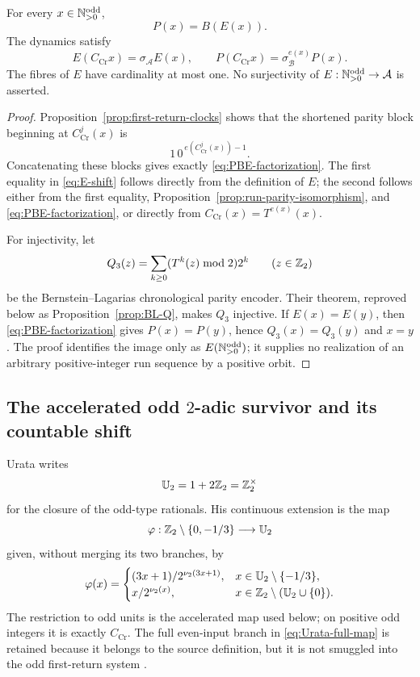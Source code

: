\begin{theorem}
\label{thm:first-return-coding}
For every $x\in\mathbb{N}_{>0}^{\mathrm{odd}}$,
\begin{equation}
\label{eq:PBE-factorization}
 P(x)=B(E(x)).
\end{equation}
The dynamics satisfy
\begin{equation}
\label{eq:E-shift}
 E(C_{\mathrm{Cr}}x)=\sigma_{\mathcal A}E(x),
 \qquad
 P(C_{\mathrm{Cr}}x)=\sigma_{\mathcal B}^{e(x)}P(x).
\end{equation}
The fibres of $E$ have cardinality at most one.  No surjectivity of
$E:\mathbb{N}_{>0}^{\mathrm{odd}}\to\mathcal A$ is asserted.
\end{theorem}

\begin{proof}
Proposition~\ref{prop:first-return-clocks} shows that the shortened parity
block beginning at $C_{\mathrm{Cr}}^j(x)$ is
\[
 1\,0^{\,e(C_{\mathrm{Cr}}^j(x))-1}.
\]
Concatenating these blocks gives exactly \eqref{eq:PBE-factorization}.  The
first equality in \eqref{eq:E-shift} follows directly from the definition of
$E$; the second follows either from the first equality,
Proposition~\ref{prop:run-parity-isomorphism}, and
\eqref{eq:PBE-factorization}, or directly from
$C_{\mathrm{Cr}}(x)=T^{e(x)}(x)$.

For injectivity, let
\[
 Q_3(z)=\sum_{k\geq0}(T^k(z)\bmod2)2^k
 \qquad(z\in\mathbb{Z}_{2})
\]
be the Bernstein--Lagarias chronological parity encoder.  Their theorem,
reproved below as Proposition~\ref{prop:BL-Q}, makes $Q_3$ injective.  If
$E(x)=E(y)$, then \eqref{eq:PBE-factorization} gives $P(x)=P(y)$, hence
$Q_3(x)=Q_3(y)$ and $x=y$.  The proof identifies the image only as
$E(\mathbb{N}_{>0}^{\mathrm{odd}})$; it supplies no realization of an arbitrary positive-integer run
sequence by a positive orbit.
\end{proof}

\subsection{The accelerated odd \texorpdfstring{$2$}{2}-adic survivor and its
countable shift}

Urata writes
\[
 \mathbb U_2=1+2\mathbb{Z}_{2}=\mathbb{Z}_{2}^{\times}
\]
for the closure of the odd-type rationals.  His continuous extension is the
map
\[
 \varphi:\mathbb{Z}_{2}\setminus\{0,-1/3\}\longrightarrow\mathbb U_2
\]
given, without merging its two branches, by
\begin{equation}
\label{eq:Urata-full-map}
 \varphi(x)=
 \begin{cases}
  (3x+1)/2^{\nu_{2}(3x+1)},
    &x\in\mathbb U_2\setminus\{-1/3\},\\
  x/2^{\nu_{2}(x)},
    &x\in\mathbb{Z}_{2}\setminus(\mathbb U_2\cup\{0\}).
 \end{cases}
\end{equation}
The restriction to odd units is the accelerated map used below; on positive
odd integers it is exactly $C_{\mathrm{Cr}}$.  The full even-input branch in
\eqref{eq:Urata-full-map} is retained because it belongs to the source
definition, but it is not smuggled into the odd first-return system
\cite[printed pp.~5--8]{Urata2003}.

